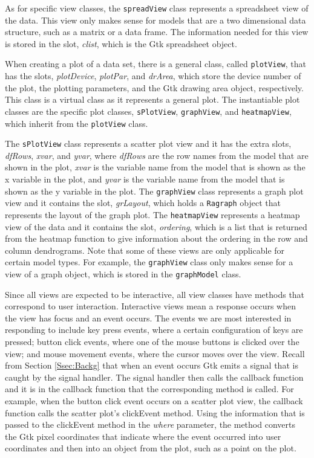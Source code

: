 \documentclass{article}[11pt]
\newcommand{\Rfunction}[1]{{\textsf{#1}}}
\newcommand{\Robject}[1]{{\texttt{#1}}}
\newcommand{\Rslot}[1]{\textsl{#1}}
\newcommand{\Rclass}[1]{\texttt{#1}}
\begin{document}
As for specific view classes, the \Rclass{spreadView} class
represents a spreadsheet view of the data.  This view only makes sense for
models that are a two dimensional data structure, such as a matrix or a data
frame.  The information needed for this view is stored in the slot,
\Rslot{clist}, which is the Gtk spreadsheet object.

When creating a plot of a data set, there is a general class, called
\Rclass{plotView}, that has the slots, \Rslot{plotDevice}, \Rslot{plotPar},
and \Rslot{drArea}, which store the device number of the plot, the plotting
parameters, and the Gtk drawing area object, respectively.  This class is a
virtual class as it represents a general plot.  The instantiable plot classes
are the specific plot classes, \Rclass{sPlotView}, \Rclass{graphView}, and
\Rclass{heatmapView}, which inherit from the \Rclass{plotView} class.  

The \Rclass{sPlotView} class represents a scatter plot view and it has the
extra slots, \Rslot{dfRows}, \Rslot{xvar}, and \Rslot{yvar}, where
\Rslot{dfRows} are the row names from the model that are shown in the plot,
\Rslot{xvar} is the variable name from the model that is shown as the x
variable in the plot, and \Rslot{yvar} is the variable name from the model
that is shown as the y variable in the plot.  The \Rclass{graphView} class
represents a graph plot view and it contains the slot, \Rslot{grLayout}, which
holds a \Robject{Ragraph} object that represents the layout of the graph plot.
The \Rclass{heatmapView} represents a heatmap
view of the data and it contains the slot, \Rslot{ordering}, which is a list
that is returned from the \Rfunction{heatmap} function to give information
about the ordering in the row and column dendrograms.  Note that some of these
views are only applicable for certain model types.  For example, the
\Rclass{graphView} class only makes sense for a view of a graph object,
which is stored in the \Rclass{graphModel} class. 

Since all views are expected to be interactive, all view classes have methods
that correspond to user interaction.  Interactive views mean a response
occurs when the view has focus and an event occurs.  The events we are most
interested in responding to include key press
events, where a certain configuration of keys are pressed; button click
events, where one of the mouse buttons is clicked over the view; and mouse
movement events, where the cursor moves over the view.  Recall from Section
\ref{Ssec:Backg} that when an event occurs Gtk emits a signal that is caught
by the signal handler.  The signal handler then calls the callback function
and it is in the callback function that the corresponding method is called.
For example, when the button click event occurs on a scatter plot view, the
callback function calls the scatter plot's \Rfunction{clickEvent} method.
Using the information that is passed to the \Rfunction{clickEvent} method in
the \Rslot{where} parameter, the method converts the Gtk pixel coordinates
that indicate where the event occurred into user coordinates and then into an
object from the plot, such as a point on the plot. 
\end{document}
